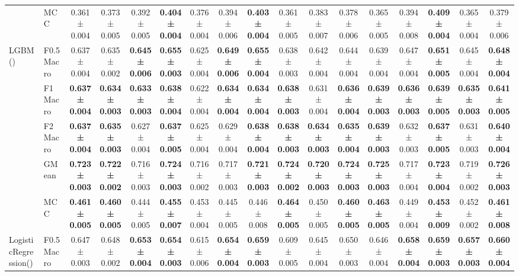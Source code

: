 \begin{table}[H]
{\begin{tabular}{llccccccccccccccc}
 & MCC & 0.361 ± 0.004 & 0.373 ± 0.005 & 0.392 ± 0.005 & \textbf{0.404 ± 0.004} & 0.376 ± 0.004 & 0.394 ± 0.006 & \textbf{0.403 ± 0.004} & 0.361 ± 0.005 & 0.383 ± 0.007 & 0.378 ± 0.006 & 0.365 ± 0.005 & 0.394 ± 0.008 & \textbf{0.409 ± 0.004} & 0.365 ± 0.004 & 0.379 ± 0.006 \\
\cline{1-17}
\multirow[t]{5}{*}{LGBM()} & F0.5 Macro & 0.637 ± 0.004 & 0.635 ± 0.002 & \textbf{0.645 ± 0.006} & \textbf{0.655 ± 0.003} & 0.625 ± 0.004 & \textbf{0.649 ± 0.006} & \textbf{0.655 ± 0.004} & 0.638 ± 0.003 & 0.642 ± 0.004 & 0.644 ± 0.004 & 0.639 ± 0.004 & 0.647 ± 0.004 & \textbf{0.651 ± 0.005} & 0.645 ± 0.004 & \textbf{0.648 ± 0.004} \\
 & F1 Macro & \textbf{0.637 ± 0.004} & \textbf{0.634 ± 0.003} & \textbf{0.633 ± 0.003} & \textbf{0.638 ± 0.004} & 0.622 ± 0.004 & \textbf{0.634 ± 0.004} & \textbf{0.634 ± 0.004} & \textbf{0.638 ± 0.003} & 0.631 ± 0.004 & \textbf{0.636 ± 0.004} & \textbf{0.639 ± 0.003} & \textbf{0.636 ± 0.003} & \textbf{0.639 ± 0.005} & \textbf{0.635 ± 0.003} & \textbf{0.641 ± 0.005} \\
 & F2 Macro & \textbf{0.637 ± 0.004} & \textbf{0.635 ± 0.003} & 0.627 ± 0.004 & \textbf{0.637 ± 0.005} & 0.625 ± 0.004 & 0.629 ± 0.004 & \textbf{0.638 ± 0.004} & \textbf{0.638 ± 0.003} & \textbf{0.634 ± 0.003} & \textbf{0.635 ± 0.004} & \textbf{0.639 ± 0.003} & 0.632 ± 0.003 & \textbf{0.637 ± 0.005} & 0.631 ± 0.003 & \textbf{0.640 ± 0.004} \\
 & GMean & \textbf{0.723 ± 0.003} & \textbf{0.722 ± 0.002} & 0.716 ± 0.003 & \textbf{0.724 ± 0.003} & 0.716 ± 0.002 & 0.717 ± 0.003 & \textbf{0.721 ± 0.003} & \textbf{0.724 ± 0.002} & \textbf{0.720 ± 0.003} & \textbf{0.724 ± 0.003} & \textbf{0.725 ± 0.003} & 0.717 ± 0.004 & \textbf{0.723 ± 0.004} & 0.719 ± 0.002 & \textbf{0.726 ± 0.003} \\
 & MCC & \textbf{0.461 ± 0.005} & \textbf{0.460 ± 0.005} & 0.444 ± 0.005 & \textbf{0.455 ± 0.007} & 0.453 ± 0.004 & 0.445 ± 0.005 & 0.446 ± 0.008 & \textbf{0.464 ± 0.005} & 0.450 ± 0.005 & \textbf{0.460 ± 0.005} & \textbf{0.463 ± 0.005} & 0.449 ± 0.004 & \textbf{0.453 ± 0.009} & 0.452 ± 0.002 & \textbf{0.461 ± 0.008} \\
\cline{1-17}
\multirow[t]{5}{*}{LogisticRegression()} & F0.5 Macro & 0.647 ± 0.003 & 0.648 ± 0.002 & \textbf{0.653 ± 0.004} & \textbf{0.654 ± 0.003} & 0.615 ± 0.006 & \textbf{0.654 ± 0.004} & \textbf{0.659 ± 0.003} & 0.609 ± 0.005 & 0.645 ± 0.004 & 0.650 ± 0.003 & 0.646 ± 0.004 & \textbf{0.658 ± 0.004} & \textbf{0.659 ± 0.003} & \textbf{0.657 ± 0.003} & \textbf{0.660 ± 0.004} \\

\end{tabular}}
\end{table}
